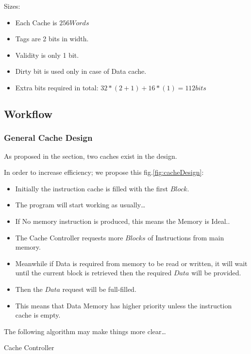     Sizes:
    \begin{itemize}
        \item Each Cache is $256Words$
        \item Tags are 2 bits in width.
        \item Validity is only 1 bit.
        \item Dirty bit is used only in case of Data cache.
        \item Extra bits required in total: $32*(2+1) + 16*(1) = 112bits$
    \end{itemize}


\subsection{Workflow}
\label{workflowSection}
    \subsubsection{General Cache Design}
    As proposed in the  section, two caches exist in the design.

    In order to increase efficiency; we propose this fig.\ref{fig:cacheDesign}:
    \begin{itemize}
        \item Initially the instruction cache is filled with the first $Block$.
        \item The program will start working as usually\dots
        \item If No memory instruction is produced, this means the Memory is Ideal..
        \item The Cache Controller requests more $Blocks$ of Instructions from main memory.
        \item Meanwhile if Data is required from memory to be read or written, it will wait 
            until the current block is retrieved then the required $Data$ will be provided.
        \item Then the $Data$ request will be full-filled.
        \item This means that Data Memory has higher priority unless the instruction cache is empty.
    \end{itemize}

    The following algorithm may make things more clear\dots

    \begin{algorithm}
        \SetAlgoLined
        \caption{Cache Controller}
        \end{algorithm}
    

